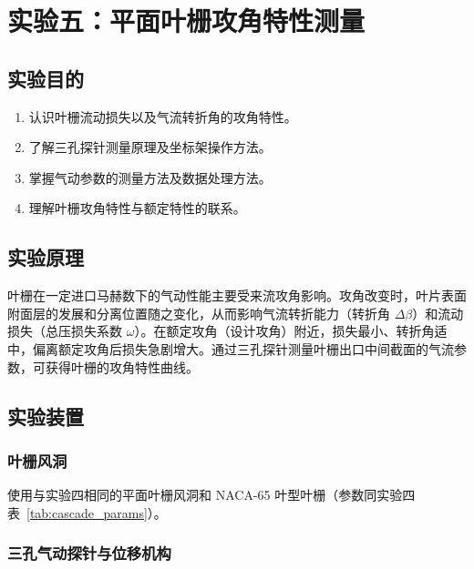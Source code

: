 
\section{实验五：平面叶栅攻角特性测量}

\subsection{实验目的}

\begin{enumerate}
    \item 认识叶栅流动损失以及气流转折角的攻角特性。
    \item 了解三孔探针测量原理及坐标架操作方法。
    \item 掌握气动参数的测量方法及数据处理方法。
    \item 理解叶栅攻角特性与额定特性的联系。
\end{enumerate}

\subsection{实验原理}

叶栅在一定进口马赫数下的气动性能主要受来流攻角影响。攻角改变时，叶片表面附面层的发展和分离位置随之变化，从而影响气流转折能力（转折角 $\Delta\beta$）和流动损失（总压损失系数 $\omega$）。在额定攻角（设计攻角）附近，损失最小、转折角适中，偏离额定攻角后损失急剧增大。通过三孔探针测量叶栅出口中间截面的气流参数，可获得叶栅的攻角特性曲线。

\subsection{实验装置}

\subsubsection{叶栅风洞}

使用与实验四相同的平面叶栅风洞和 NACA-65 叶型叶栅（参数同实验四表~\ref{tab:cascade_params}）。

\subsubsection{三孔气动探针与位移机构}

